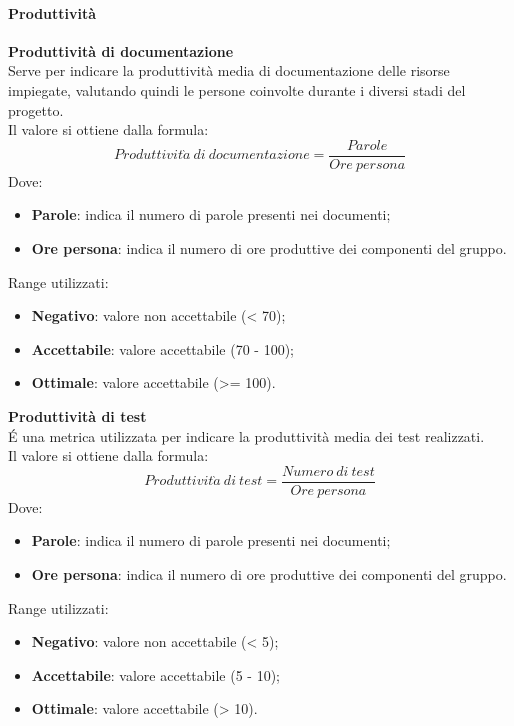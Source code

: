 \documentclass[../PianoDiQualifica.tex]{subfiles}
\begin{document}
				\paragraph{Produttività}

				\textbf{Produttività di documentazione}\\
				Serve per indicare la produttività media di documentazione delle risorse impiegate, valutando quindi le persone coinvolte durante i diversi stadi del progetto. \\Il valore si ottiene dalla formula:
				\begin{equation*}
					Produttivit\grave{a} \ di \ documentazione = \frac{Parole}{Ore \ persona}
				\end{equation*}
				Dove:
				\begin{itemize}
					\item \textbf{Parole}: indica il numero di parole presenti nei documenti;
					\item \textbf{Ore persona}: indica il numero di ore produttive dei componenti del gruppo.
				\end{itemize}
				Range utilizzati:
				\begin{itemize}
					\item \textbf{Negativo}: valore non accettabile (< 70);
					\item \textbf{Accettabile}: valore accettabile (70 - 100);
					\item \textbf{Ottimale}: valore accettabile (>= 100).
				\end{itemize}
				\textbf{Produttività di test}\\
				É una metrica utilizzata per indicare la produttività media dei test realizzati. \\Il valore si ottiene dalla formula:
				\begin{equation*}
					Produttivit\grave{a} \ di \ test = \frac{Numero \ di \ test}{Ore \ persona}
				\end{equation*}
				Dove:
				\begin{itemize}
					\item \textbf{Parole}: indica il numero di parole presenti nei documenti;
					\item \textbf{Ore persona}: indica il numero di ore produttive dei componenti del gruppo.
				\end{itemize}
				Range utilizzati:
				\begin{itemize}
					\item \textbf{Negativo}: valore non accettabile (< 5);
					\item \textbf{Accettabile}: valore accettabile (5 - 10);
					\item \textbf{Ottimale}: valore accettabile (> 10).
				\end{itemize}
\end{document}
